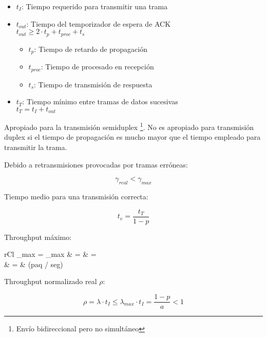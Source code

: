 \documentclass[10pt,landscape]{article}
\begin{document}
\begin{multicols}{3}
	\begin{itemize}
		\item $t_{I}$: Tiempo requerido para transmitir una trama
		\item $t_{out}$: Tiempo del temporizador de espera de ACK\\
			\qquad $t_{out} \geq 2 \cdot t_{p} + t_{proc} + t_{s}$
			
			\begin{itemize}
				\item $t_{p}$: Tiempo de retardo de propagación
				\item $t_{proc}$: Tiempo de procesado en recepción
				\item $t_{s}$: Tiempo de transmisión de respuesta
			\end{itemize}
		\item $t_{T}$: Tiempo mínimo entre tramas de datos sucesivas \\
			\qquad $t_{T} = t_{I} + t_{out}$
	\end{itemize}

Apropiado para la transmisión semiduplex \footnote{Envío bidireccional pero no simultáneo}. No es apropiado para transmisión duplex si el tiempo de propagación es mucho mayor que el tiempo empleado para transmitir la trama.

Debido a retransmisiones provocadas por tramas erróneas:

	\begin{equation*}
	\gamma_{real} < \gamma_{max}
	\end{equation*}
	
Tiempo medio para una transmisión correcta:

	\begin{equation*}
	t_{v} = \frac{t_{T}}{1- p}
	\end{equation*}
	
Throughput máximo:
	
	\begin{IEEEeqnarray*}{rCl}
		\gamma_{max}  = \lambda_{max} & = &  = 	\\
								   & = &  (paq / seg)
	\end{IEEEeqnarray*}
	
Throughput normalizado real $\rho$:

	\begin{equation*}
	\rho = \lambda \cdot t_{I} \leq \lambda_{max} \cdot t_{I} = \frac{1 - p}{a} < 1
	\end{equation*}
	

\end{multicols}
\end{document}
